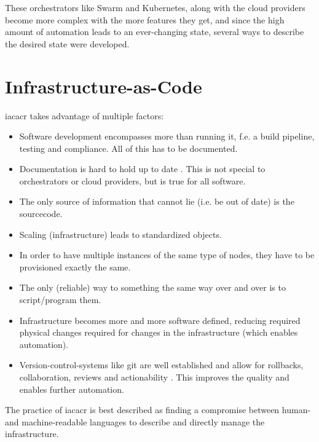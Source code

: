 \newline
These orchestrators like Swarm and Kubernetes, along with the cloud providers become more complex with the more features they get, and since the high amount of automation leads to an ever-changing state, several ways to describe the desired state were developed.



\section{Infrastructure-as-Code}
\Gls{iacacr} takes advantage of multiple factors:
\begin{itemize}
  \item Software development encompasses more than running it, f.e. a build pipeline, testing and compliance. All of this has to be documented.
  \item Documentation is hard to hold up to date \cite{software_engineers_documentation} \cite{software_documentation_issues}. This is not special to orchestrators or cloud providers, but is true for all software.
  \item The only source of information that cannot lie (i.e. be out of date) is the sourcecode.
  \item Scaling (infrastructure) leads to standardized objects.
  \item In order to have multiple instances of the same type of nodes, they have to be provisioned exactly the same.
  \item The only (reliable) way to something the same way over and over is to script/program them.
  \item Infrastructure becomes more and more software defined, reducing required physical changes required for changes in the infrastructure (which enables automation).
  \item Version-control-systems like git are well established and allow for rollbacks, collaboration, reviews and actionability \cite{iac_oreilly}. This improves the quality and enables further automation.
\end{itemize}
The practice of \gls{iacacr} is best described as finding a compromise between human- and machine-readable languages to describe and directly manage the infrastructure.
\newline

